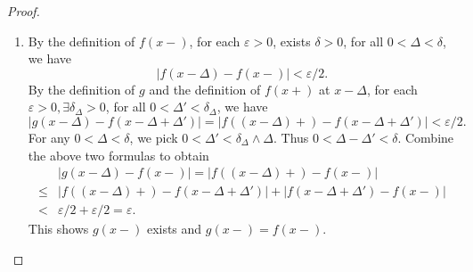 \documentclass[12pt]{article}
\renewcommand{\(}{\left(}%
\renewcommand{\)}{\right)}%
\renewcommand{\[}{\left[}%
\renewcommand{\]}{\right]}%
\newtheorem{proof}{Proof.}}
\begin{document}
\begin{proof}
\begin{enumerate}
\begin{equation*}
     \begin{split}
      &|g(x-s)-g(x-h)|=|f((x-s)+)-f((x-h)+)|\\
      \leq& |f((x-s)+)-f(x-s+\Delta_s ) |+|f(x-s+\Delta_s )-f(x-h+\Delta_h ) |\\
      &+|f(x-h+\Delta_h )- f((x-h)+)|\\
      <&\varepsilon/3+\varepsilon/3+\varepsilon/3=\varepsilon.
     \end{split}
    \end{equation*}
    By {\sffamily Cauchy's criterion}, we know $\lim_{z\to x-}g(z)$ exists.
    \item By the definition of $f(x-)$, for each $\varepsilon>0$, exists $\delta>0$, for all $0<\Delta<\delta$, we have
    \begin{equation*}
     |f(x-\Delta )-f(x-)|<\varepsilon/2.
    \end{equation*}
    By the definition of $g$ and the definition of $f(x+)$ at $x-\Delta $, for each $\varepsilon>0,\exists \delta_\Delta >0$, for all $0<\Delta' <\delta_\Delta$, we have
    \begin{equation*}
     |g(x-\Delta)-f(x-\Delta+\Delta' )|=|f((x-\Delta)+)-f(x-\Delta+\Delta' )|<\varepsilon/2.
    \end{equation*}
    For any $0<\Delta<\delta$, we pick $0<\Delta'<\delta_\Delta\wedge \Delta $. Thus $0<\Delta-\Delta'<\delta$. Combine the above two formulas to obtain
    \begin{equation*}
     \begin{split}
      &|g(x-\Delta )-f(x-)|= |f((x-\Delta)+ )-f(x-)|\\
      \leq & |f((x-\Delta)+ )-f(x-\Delta+\Delta' ) |+|f(x-\Delta+\Delta' )-f(x-)|\\
      < &\varepsilon/2+\varepsilon/2=\varepsilon.
     \end{split}
    \end{equation*}
    This shows $g(x-)$ exists and $g(x-)=f(x-)$.
   \end{enumerate}
  \end{proof}
\end{document}
